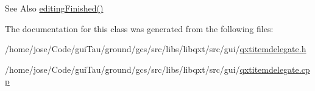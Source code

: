 \begin{DoxySeeAlso}{See Also}
\hyperlink{class_qxt_item_delegate_a593c068bb974266241f9a48c28200d26}{editing\-Finished()} 
\end{DoxySeeAlso}


The documentation for this class was generated from the following files\-:\begin{DoxyCompactItemize}
\item 
/home/jose/\-Code/gui\-Tau/ground/gcs/src/libs/libqxt/src/gui/\hyperlink{qxtitemdelegate_8h}{qxtitemdelegate.\-h}\item 
/home/jose/\-Code/gui\-Tau/ground/gcs/src/libs/libqxt/src/gui/\hyperlink{qxtitemdelegate_8cpp}{qxtitemdelegate.\-cpp}\end{DoxyCompactItemize}
